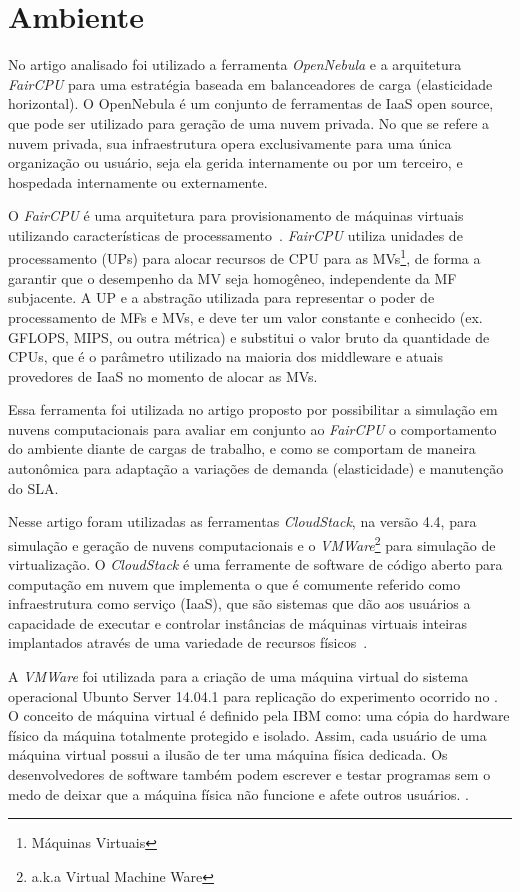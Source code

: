 \section{Ambiente}

No artigo analisado foi utilizado a ferramenta \textit{OpenNebula} e a arquitetura \textit{FairCPU} para uma estratégia baseada em balanceadores de carga (elasticidade horizontal). O OpenNebula é um conjunto de ferramentas de IaaS open source, que pode ser utilizado para geração de uma nuvem privada. No que se refere a nuvem privada, sua infraestrutura opera exclusivamente para uma única organização ou usuário, seja ela gerida internamente ou por um terceiro, e hospedada internamente ou externamente.

O \textit{FairCPU} é uma arquitetura para provisionamento de máquinas virtuais utilizando
características de processamento~\cite{faircpu:12}. \textit{FairCPU} utiliza unidades de processamento (UPs) para alocar recursos de CPU para as MVs\footnote{Máquinas Virtuais}, de forma a garantir que o desempenho da MV seja homogêneo, independente da MF subjacente. A UP e a abstração utilizada para representar o poder de processamento de MFs e MVs, e deve ter um valor constante e conhecido (ex. GFLOPS, MIPS, ou outra métrica) e substitui o valor bruto da quantidade de CPUs, que é o parâmetro utilizado na maioria dos middleware e atuais provedores de IaaS no momento de alocar as MVs.

Essa ferramenta foi utilizada no artigo \cite{coutinho_et_al:14} proposto por possibilitar a simulação em nuvens computacionais para avaliar em conjunto ao \textit{FairCPU} o comportamento do ambiente diante de cargas de trabalho, e como se comportam de maneira autonômica para adaptação a variações de demanda (elasticidade) e manutenção do SLA.

Nesse artigo foram utilizadas as ferramentas \textit{CloudStack}, na versão 4.4, para simulação e geração de nuvens computacionais e o \textit{VMWare}\footnote{a.k.a Virtual Machine Ware} para simulação de virtualização. O \textit{CloudStack}
é uma ferramente de software de código aberto para computação em nuvem que implementa o que é comumente referido como infraestrutura como serviço (IaaS), que são sistemas que dão aos usuários a capacidade de executar e controlar instâncias de máquinas virtuais inteiras implantados através de uma variedade de recursos físicos~\cite{nurmi_2009}. 

A \textit{VMWare} foi utilizada para a criação de uma máquina virtual do sistema operacional Ubunto Server 14.04.1 para replicação do experimento ocorrido no \cite{elaine_et_al:14}. O conceito de máquina virtual é definido pela IBM como: uma cópia do hardware físico da máquina totalmente protegido e isolado. Assim, cada usuário de uma máquina virtual possui a ilusão de ter uma máquina física dedicada. Os desenvolvedores de software também podem escrever e testar programas sem o medo de deixar que a máquina física
não funcione e afete outros usuários. \cite{sugerman2001virtualizing}.
